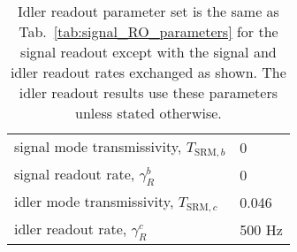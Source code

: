 \begin{table}[]
\centering
\begin{tabular}{@{}ll@{}}
\toprule
signal mode transmissivity, $T_{\text{SRM},b}$ & 0 \\ 
signal readout rate, $\gamma^b_R$ & 0 \\
idler mode transmissivity, $T_{\text{SRM},c}$ & 0.046 \\
idler readout rate, $\gamma^c_R$ & 500 Hz \\ \bottomrule
\end{tabular}
\caption{Idler readout parameter set is the same as Tab.~\ref{tab:signal_RO_parameters} for the signal readout except with the signal and idler readout rates exchanged as shown. The idler readout results use these parameters unless stated otherwise.}
\label{tab:idler_RO_parameters}
\end{table}

